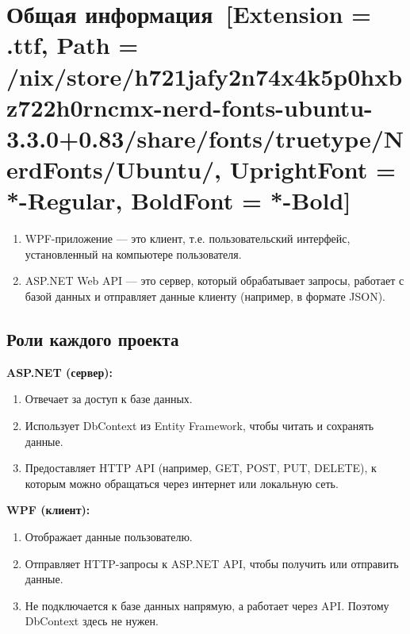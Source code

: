 \documentclass[12pt]{article}
\newcommand{\icon}[1]{\fontspec{UbuntuNerdFont}[Extension = .ttf,
  Path = /nix/store/h721jafy2n74x4k5p0hxbz722h0rncmx-nerd-fonts-ubuntu-3.3.0+0.83/share/fonts/truetype/NerdFonts/Ubuntu/,
  UprightFont = *-Regular,
BoldFont = *-Bold] #1}
\newcommand{\iicon}[1]{{\icon{#1}}}
\numberwithin{listing}{section}
\numberwithin{figure}{section}
\begin{document}
\newpage

\section{Общая информация~\texorpdfstring{\iicon{}}{}}
\begin{enumerate}
	\item WPF-приложение — это клиент, т.е. пользовательский интерфейс, установленный на компьютере пользователя.
	\item ASP.NET Web API — это сервер, который обрабатывает запросы, работает с базой данных и отправляет данные клиенту (например, в формате JSON).
\end{enumerate}

\subsection{Роли каждого проекта}
\noindent \textbf{ASP.NET (сервер):}
\begin{enumerate}
	\item Отвечает за доступ к базе данных.
	\item Использует DbContext из Entity Framework, чтобы читать и сохранять данные.
	\item Предоставляет HTTP API (например, GET, POST, PUT, DELETE), к которым можно обращаться через интернет или локальную сеть.
\end{enumerate}

\noindent \textbf{WPF (клиент):}
\begin{enumerate}
	\item Отображает данные пользователю.
	\item Отправляет HTTP-запросы к ASP.NET API, чтобы получить или отправить данные.
	\item Не подключается к базе данных напрямую, а работает через API. Поэтому DbContext здесь не нужен.
\end{enumerate}
\end{document}
